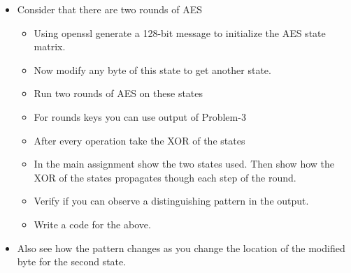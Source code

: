 \documentclass[10pt, a4paper]{article}
\begin{document}
\newpage
\begin{Problem}
	\begin{itemize}
		\item Consider that there are two rounds of AES
		      \begin{itemize}
			      \item Using openssl generate a 128-bit message to initialize the AES state matrix.
			      \item Now modify any byte of this state to get another state.
			      \item Run two rounds of AES on these states
			      \item For rounds keys you can use output of Problem-3
			      \item After every operation take the XOR of the states
			      \item In the main assignment show the two states used. Then show how the XOR of the
			            states propagates though each step of the round.
			      \item Verify if you can observe a distinguishing pattern in the output.
			      \item Write a code for the above.
		      \end{itemize}
		\item Also see how the pattern changes as you change the location of the modified byte for the
		      second state.
	\end{itemize}
\end{Problem}
\end{document}
